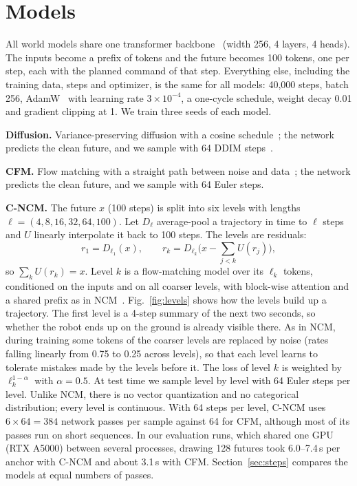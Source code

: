 \documentclass[conference]{IEEEtran}
\newcommand{\cncm}{C-NCM}
\begin{document}
\section{Models}

All world models share one transformer backbone~\cite{vaswani2017attention} (width 256,
4 layers, 4 heads). The inputs become a prefix of tokens and the future becomes 100 tokens,
one per step, each with the planned command of that step. Everything else, including the
training data, steps and optimizer, is the same for all models: 40,000 steps, batch 256,
AdamW~\cite{loshchilov2019adamw} with learning rate $3\times10^{-4}$, a one-cycle schedule,
weight decay 0.01 and gradient clipping at 1. We train three seeds of each model.

\textbf{Diffusion.} Variance-preserving diffusion with a cosine
schedule~\cite{nichol2021improved}; the network predicts the clean future, and we sample
with 64 DDIM steps~\cite{song2021ddim}.

\textbf{CFM.} Flow matching with a straight path between noise and data~\cite{lipman2023flow,liu2023rectified};
the network predicts the clean future, and we sample with 64 Euler steps.

\textbf{\cncm{}.} The future $x$ (100 steps) is split into six levels with lengths
$\ell = (4, 8, 16, 32, 64, 100)$. Let $D_\ell$ average-pool a trajectory in time to $\ell$
steps and $U$ linearly interpolate it back to 100 steps. The levels are residuals:
\begin{equation}
  r_1 = D_{\ell_1}(x), \qquad r_k = D_{\ell_k}\Big(x - \sum_{j<k} U(r_j)\Big),
\end{equation}
so $\sum_k U(r_k) = x$. Level $k$ is a flow-matching model over its $\ell_k$ tokens,
conditioned on the inputs and on all coarser levels, with block-wise attention and a
shared prefix as in NCM~\cite{kumbong2026ncm}. Fig.~\ref{fig:levels} shows how the levels
build up a trajectory. The first level is a 4-step summary of the next two seconds, so
whether the robot ends up on the ground is already visible there. As in NCM, during
training some tokens of the coarser levels are replaced by noise (rates falling linearly
from 0.75 to 0.25 across levels), so that each level learns to tolerate mistakes made by
the levels before it. The loss of level $k$ is weighted by $\ell_k^{1-\alpha}$ with
$\alpha = 0.5$. At test time we sample level by level with 64 Euler steps per level.
Unlike NCM, there is no vector quantization and no categorical distribution; every level
is continuous. With 64 steps per level, \cncm{} uses $6\times64 = 384$ network passes per
sample against 64 for CFM, although most of its passes run on short sequences. In our
evaluation runs, which shared one GPU (RTX A5000) between several processes, drawing 128
futures took 6.0--7.4\,s per anchor with \cncm{} and about 3.1\,s with CFM.
Section~\ref{sec:steps} compares the models at equal numbers of passes.
\end{document}
